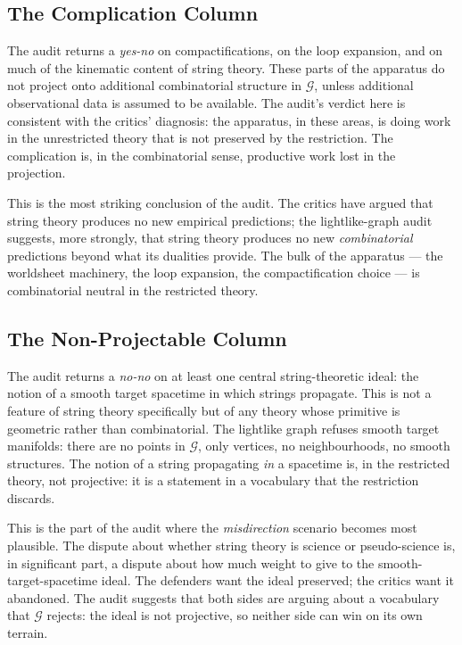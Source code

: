\documentclass[11pt]{article}
\begin{document}
\subsection{The Complication Column}

The audit returns a \emph{yes-no} on compactifications, on the loop expansion, and on much of the kinematic content of string theory. These parts of the apparatus do not project onto additional combinatorial structure in $\mathcal{G}$, unless additional observational data is assumed to be available. The audit's verdict here is consistent with the critics' diagnosis: the apparatus, in these areas, is doing work in the unrestricted theory that is not preserved by the restriction. The complication is, in the combinatorial sense, productive work lost in the projection.

This is the most striking conclusion of the audit. The critics have argued that string theory produces no new empirical predictions; the lightlike-graph audit suggests, more strongly, that string theory produces no new \emph{combinatorial} predictions beyond what its dualities provide. The bulk of the apparatus --- the worldsheet machinery, the loop expansion, the compactification choice --- is combinatorial neutral in the restricted theory.

\subsection{The Non-Projectable Column}

The audit returns a \emph{no-no} on at least one central string-theoretic ideal: the notion of a smooth target spacetime in which strings propagate. This is not a feature of string theory specifically but of any theory whose primitive is geometric rather than combinatorial. The lightlike graph refuses smooth target manifolds: there are no points in $\mathcal{G}$, only vertices, no neighbourhoods, no smooth structures. The notion of a string propagating \emph{in} a spacetime is, in the restricted theory, not projective: it is a statement in a vocabulary that the restriction discards.

This is the part of the audit where the \emph{misdirection} scenario becomes most plausible. The dispute about whether string theory is science or pseudo-science is, in significant part, a dispute about how much weight to give to the smooth-target-spacetime ideal. The defenders want the ideal preserved; the critics want it abandoned. The audit suggests that both sides are arguing about a vocabulary that $\mathcal{G}$ rejects: the ideal is not projective, so neither side can win on its own terrain.
\end{document}
